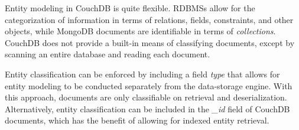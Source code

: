 Entity modeling in CouchDB is quite flexible. RDBMSs allow for the categorization of information in terms of relations, fields, constraints, and other objects, while MongoDB documents are identifiable in terms of \textit{collections}. CouchDB does not provide a built-in means of classifying documents, except by scanning an entire database and reading each document.

Entity classification can be enforced by including a field \textit{type} that allows for entity modeling to be conducted separately from the data-storage engine. With this approach, documents are only classifiable on retrieval and deserialization. Alternatively, entity classification can be included in the \textit{_id} field of CouchDB documents, which has the benefit of allowing for indexed entity retrieval.